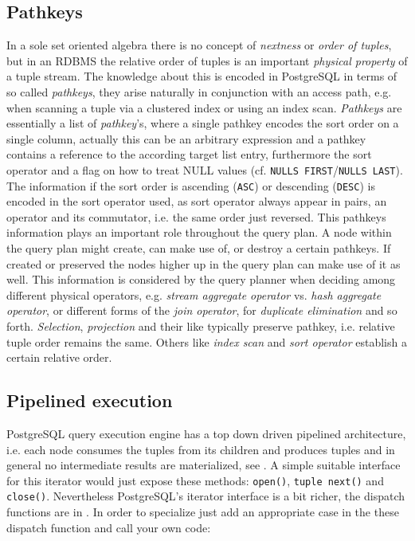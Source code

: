 \subsection{Pathkeys}
\label{sec:pathkeys}
In a sole set oriented algebra there is no concept of \emph{nextness}
or \emph{order of tuples}, but in an RDBMS the relative order of
tuples is an important \emph{physical property} of a tuple stream.
The knowledge about this is encoded in PostgreSQL in terms of so
called \emph{pathkeys}, they arise naturally in conjunction with an
access path, e.g.  when scanning a tuple via a clustered index or
using an index scan.
\emph{Pathkeys} are essentially a list of \emph{pathkey}'s, where a single
pathkey encodes the sort order on a single column, actually this can
be an arbitrary expression and a pathkey contains a reference to the
according target list entry, furthermore the sort operator and a flag
on how to treat NULL values (cf. \texttt{NULLS FIRST}/\texttt{NULLS
LAST}). The information if the sort order is ascending (\texttt{ASC})
or descending (\texttt{DESC}) is encoded in the sort operator used, as
sort operator always appear in pairs, an operator and its commutator,
i.e. the same order just reversed.  This pathkeys information plays an
important role throughout the query plan.  A node within the query plan
might create, can make use of, or destroy a certain pathkeys.  If
created or preserved the nodes higher up in the query plan can make
use of it as well.  This information is considered by the query planner when
deciding among different physical operators, e.g. \emph{stream
aggregate operator} vs. \emph{hash aggregate operator}, or different
forms of the \emph{join operator}, for \emph{duplicate elimination}
and so forth. \emph{Selection}, \emph{projection} and their like
typically preserve pathkey, i.e. relative tuple order remains the
same. Others like \emph{index scan} and \emph{sort operator} establish
a certain relative order.


\subsection{Pipelined execution}
PostgreSQL query execution engine has a top down driven pipelined
architecture, i.e. each node consumes the tuples from its children and
produces tuples and in general no intermediate results are
materialized, see .  A simple
suitable interface for this iterator would just expose these methods:
\texttt{open()}, \texttt{tuple next()} and \texttt{close()}.  Nevertheless
PostgreSQL's iterator interface is a bit richer, the dispatch functions
are in . In order to specialize
just add an appropriate case in the these dispatch function and call
your own code:

